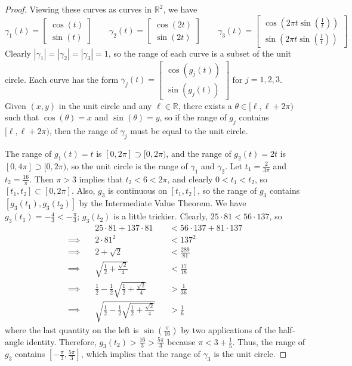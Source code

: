 \documentclass{homework}
\begin{document}
	\begin{proof}
		Viewing these curves as curves in $\mathbb{R}^2$, we have
		$$
		\gamma_1(t) = \left[\begin{matrix}\cos(t)\\ \sin(t)\end{matrix}\right]\qquad
		\gamma_2(t) = \left[\begin{matrix}\cos(2t)\\ \sin(2t)\end{matrix}\right]\qquad
		\gamma_3(t) = \left[\begin{matrix}\cos\left(2\pi t\sin\left(\frac{1}{t}\right)\right)\\ \sin\left(2\pi t\sin\left(\frac{1}{t}\right)\right)\end{matrix}\right]
		$$
		Clearly $|\gamma_1| = |\gamma_2| = |\gamma_3| = 1$, so the range of each curve is a subset of the unit circle. Each curve has the form $\gamma_j(t) = \left[\begin{matrix}\cos(g_j(t))\\\sin(g_j(t))\end{matrix}\right]$ for $j=1,2,3$. Given $(x,y)$ in the unit circle and any $\ell \in \mathbb{R}$, there exists a $\theta \in [\ell, \ell + 2\pi)$ such that $\cos(\theta) = x$ and $\sin(\theta) = y$, so if the range of $g_j$ contains $[\ell,\ell + 2\pi)$, then the range of $\gamma_j$ must be equal to the unit circle.
		
		The range of $g_1(t) = t$ is $[0,2\pi] \supset [0,2\pi)$, and the range of $g_2(t) = 2t$ is $[0,4\pi]\supset [0,2\pi)$, so the unit circle is the range of $\gamma_1$ and $\gamma_2$. Let $t_1 = \frac{2}{3\pi}$ and $t_2 = \frac{16}{\pi}$. Then $\pi >3$ implies that $t_2 < 6 < 2\pi$, and clearly $0 < t_1 < t_2$, so $[t_1, t_2] \subset [0,2\pi]$. Also, $g_3$ is continuous on $[t_1, t_2]$, so the range of $g_3$ contains $[g_3(t_1), g_3(t_2)]$ by the Intermediate Value Theorem. We have $g_3(t_1) = -\frac{4}{3} < -\frac{\pi}{3}$; $g_3(t_2)$ is a little trickier. Clearly, $25\cdot 81 < 56 \cdot 137$, so
		$$
		\begin{aligned}
			{} &\quad 25\cdot 81+137\cdot81 &&< 56\cdot137 + 81\cdot137\\
			\implies&\quad 2\cdot 81^2 &&<137^2\\
			\implies&\quad2+\sqrt{2} &&<\frac{289}{81}\\
			\implies&\quad \sqrt{\frac{1}{2}+\frac{\sqrt{2}}{4}} && < \frac{17}{18}\\
			\implies&\quad\frac{1}{2}-\frac{1}{2}\sqrt{\frac{1}{2}+\frac{\sqrt{2}}{4}}&&>\frac{1}{36}\\
			\implies&\quad \sqrt{\frac{1}{2}-\frac{1}{2}\sqrt{\frac{1}{2}+\frac{\sqrt{2}}{4}}} &&> \frac{1}{6}
		\end{aligned}
		$$
		where the last quantity on the left is $\sin \left(\frac{\pi}{16}\right)$ by two applications of the half-angle identity. Therefore, $g_3(t_2) > \frac{16}{3} > \frac{5\pi}{3}$ because $\pi < 3 + \frac{1}{5}$. Thus, the range of $g_3$ contains $\left[-\frac{\pi}{3}, \frac{5\pi}{3}\right]$, which implies that the range of $\gamma_3$ is the unit circle.
		

\end{proof}
\end{document}
